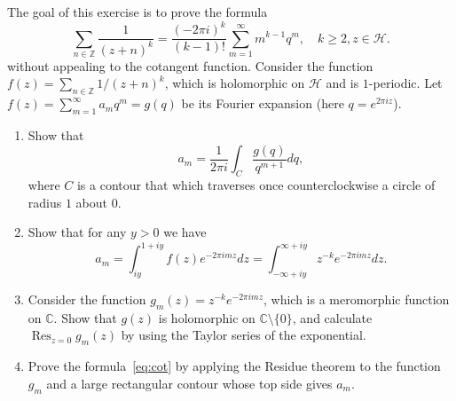 \documentclass[paper=a4, fontsize=11pt]{scrartcl} %
\numberwithin{equation}{section} %
\numberwithin{figure}{section} %
\numberwithin{table}{section} %
\newcommand{\bbC}{\mathbb{C}}
\newcommand{\bbZ}{\mathbb{Z}}
\newcommand{\CC}{\bbC}
\newcommand{\ZZ}{\bbZ}
\newcommand{\cH}{\mathcal{H}}
\begin{document}
The goal of this exercise is to prove the formula
\begin{equation}
\label{eq:cot}
\sum_{n\in\ZZ} \frac{1}{(z+n)^k} = \frac{(-2\pi i)^k}{(k-1)!}\sum_{m=1}^\infty m^{k-1}q^m,\quad k\geq 2, z\in\cH.
\end{equation}
without appealing to the cotangent function. Consider the function $f(z) = \sum_{n\in\ZZ} 1/(z+n)^k$, which is holomorphic on $\cH$ and is $1$-periodic. Let $f(z) = \sum_{m=1}^\infty a_m q^m = g(q)$ be its Fourier expansion (here $q = e^{2\pi i z}$).
\begin{enumerate}
\item Show that
\[
a_m = \frac{1}{2\pi i} \int_C\frac{g(q)}{q^{m+1}} dq,
\]
where $C$ is a contour that which traverses once counterclockwise a circle of radius $1$ about $0$.
\item Show that for any $y > 0$ we have
\[
a_m = \int_{iy}^{1+iy} f(z) e^{-2\pi i m z}dz = \int_{-\infty + iy}^{\infty + iy} z^{-k} e^{-2\pi i mz }dz.
\]
\item Consider the function $g_m(z) = z^{-k} e^{-2\pi i m z}$, which is a meromorphic function on $\CC$. Show that $g(z)$ is holomorphic on $\CC\setminus\{0\}$, and calculate $\operatorname{Res}_{z=0} g_m(z)$ by using the Taylor series of the exponential.
\item Prove the formula~\eqref{eq:cot} by applying the Residue theorem to the function $g_m$ and a large rectangular contour whose top side gives $a_m$.
\end{enumerate}


\end{document}
